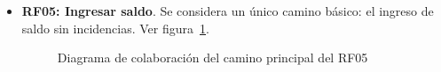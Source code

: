 \begin{itemize}
	\FloatBarrier
	\item \textbf{RF05: Ingresar saldo}. Se considera un único camino básico: el ingreso de saldo sin incidencias. Ver figura~\ref{fig:diagramaColaboracion_RF05_1}.
	\begin{figure}[!htb]
		\centering
		\caption{Diagrama de colaboración del camino principal del RF05}
		\label{fig:diagramaColaboracion_RF05_1}
	\end{figure}
	

\end{itemize}
